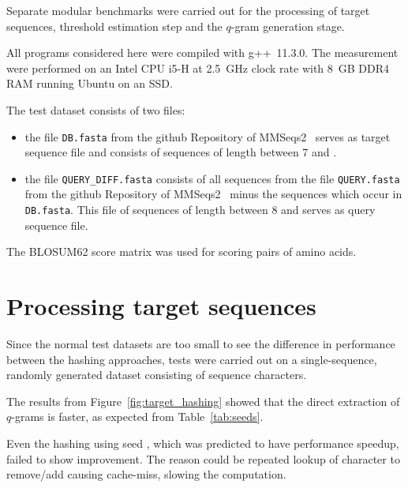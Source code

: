 \documentclass[twoside,a4paper,bsc]{master}
\newcommand{\Qgram}[1]{\(#1\)-gram}
\begin{document}
Separate modular benchmarks were carried out for the processing of target
sequences, threshold estimation step and the \Qgram{q} generation stage.

All programs considered here were compiled with
\mbox{g++ 11.3.0}. The measurement were performed on an Intel CPU
i5-H at 2.5~GHz clock rate with 8~GB DDR4 RAM
running Ubuntu on an SSD.

The test dataset consists of two files:
\begin{itemize}
\item the file \texttt{DB.fasta} from the github Repository of
MMSeqs2~\cite{MMseqs2Repository} serves as target sequence file and
consists of  sequences of length between 7 and .
\item the file \texttt{QUERY\_DIFF.fasta} consists of all sequences from
the file \texttt{QUERY.fasta} from the github Repository of
MMSeqs2~\cite{MMseqs2Repository} minus the sequences which occur in
\texttt{DB.fasta}. This file of  sequences of length between
8 and  serves as query sequence file.
\end{itemize}

The BLOSUM62 score matrix was used for scoring pairs of amino acids.

\section{Processing target sequences}
Since the normal test datasets are too small to see the difference in
performance between the hashing approaches, tests were carried out on a 
single-sequence, randomly generated dataset consisting of  
sequence characters.

The
results from Figure~\ref{fig:target_hashing} showed that the direct
extraction of \Qgram{q}s is faster, as expected from
Table~\ref{tab:seeds}.

Even the hashing using seed , which
was predicted to have performance speedup, failed to show improvement. The
reason could be repeated lookup of character to remove/add causing cache-miss,
slowing the computation.
\end{document}
